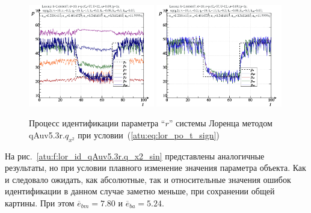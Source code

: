 \begin{figure}[h!]
  \centerline{
    \includegraphics[width=0.49\textwidth]{p/cha/lor/qAuv5.3r/lor_qAuv5_3r_qy2-p_t_pi_sign.png}
    \hfill
    \includegraphics[width=0.49\textwidth]{p/cha/lor/qAuv5.3r/lor_qAuv5_3r_qy2-p_t_pz_sign.png}
  }
  \caption{Процесс идентификации параметра ``$r$'' системы Лоренца методом qAuv5.3r.$q_{x^2}$ при условии~(\ref{atu:eq:lor_po_t_sign})}
  \label{atu:f:lor_id_qAuv5.3r.q_x2_sign}
\end{figure}


На рис.~\ref{atu:f:lor_id_qAuv5.3r.q_x2_sin} представлены аналогичные результаты,
но при условии плавного изменение значения параметра объекта. Как и следовало ожидать,
как абсолютные, так и относительные значения ошибок идентификации в данном случае заметно
меньше, при сохранении общей картины.
При этом
$\overline{e}_{bm}=7.80$
и
$\overline{e}_{ba}=5.24$.


